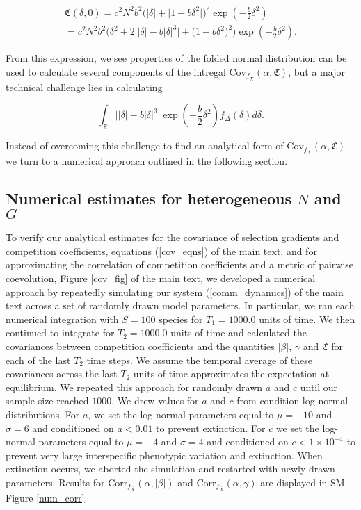 \documentclass[]{article}
\begin{document}
\begin{multline}
\mathfrak{C}(\delta,0)=c^2N^2b^2\Big(|\delta|+\big|1-b\delta^2\big|\Big)^2\exp\left(-\frac{b}{2}\delta^2\right) \\
=c^2N^2b^2\Big(\delta^2+2\big||\delta|-b|\delta|^3\big|+\big(1-b\delta^2\big)^2\Big)\exp\left(-\frac{b}{2}\delta^2\right).
\end{multline}

From this expression, we see properties of the folded normal
distribution can be used to calculate several components of the intregal
\(\mathrm{Cov}_{f_{\bar X}}(\alpha,\mathfrak{C})\), but a major
technical challenge lies in calculating

\begin{equation}
\int_{\mathbb{R}}\big||\delta|-b|\delta|^3\big|\exp\left(-\frac{b}{2}\delta^2\right)f_{\Delta}(\delta)d\delta.
\end{equation}

Instead of overcoming this challenge to find an analytical form of
\(\mathrm{Cov}_{f_{\bar X}}(\alpha,\mathfrak{C})\) we turn to a
numerical approach outlined in the following section.

\hypertarget{numerical-estimates-for-heterogeneous-n-and-g}{%
\subsection{\texorpdfstring{Numerical estimates for heterogeneous \(N\)
and
\(G\)}{Numerical estimates for heterogeneous N and G}}\label{numerical-estimates-for-heterogeneous-n-and-g}}

To verify our analytical estimates for the covariance of selection
gradients and competition coefficients, equations (\ref{cov_eqns}) of
the main text, and for approximating the correlation of competition
coefficients and a metric of pairwise coevolution, Figure \ref{cov_fig}
of the main text, we developed a numerical approach by repeatedly
simulating our system (\ref{comm_dynamics}) of the main text across a
set of randomly drawn model parameters. In particular, we ran each
numerical integration with \(S=100\) species for \(T_1=1000.0\) units of
time. We then continued to integrate for \(T_2=1000.0\) units of time
and calculated the covariances between competition coefficients and the
quantities \(|\beta|\), \(\gamma\) and \(\mathfrak{C}\) for each of the
last \(T_2\) time steps. We assume the temporal average of these
covariances across the last \(T_2\) units of time approximates the
expectation at equilibrium. We repeated this approach for randomly drawn
\(a\) and \(c\) until our sample size reached \(1000\). We drew values
for \(a\) and \(c\) from condition log-normal distributions. For \(a\),
we set the log-normal parameters equal to \(\mu=-10\) and \(\sigma=6\)
and conditioned on \(a<0.01\) to prevent extinction. For \(c\) we set
the log-normal parameters equal to \(\mu=-4\) and \(\sigma=4\) and
conditioned on \(c<1\times 10^{-4}\) to prevent very large interspecific
phenotypic variation and extinction. When extinction occurs, we aborted
the simulation and restarted with newly drawn parameters. Results for
\(\mathrm{Corr}_{f_{\bar X}}(\alpha,|\beta|)\) and
\(\mathrm{Corr}_{f_{\bar X}}(\alpha,\gamma)\) are displayed in SM Figure
\ref{num_corr}.
\end{document}
